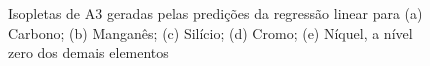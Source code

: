 \documentclass[brazil,tf,epusp]{usp}  %
\begin{document}
\begin{figure}[!h]


\caption{Isopletas de A3 geradas pelas predições da regressão linear para (a) Carbono; (b) Manganês; (c) Silício; (d) Cromo; (e) Níquel, a nível zero dos demais elementos}
\label{fig:LR_isopleths}
\end{figure}
\end{document}
